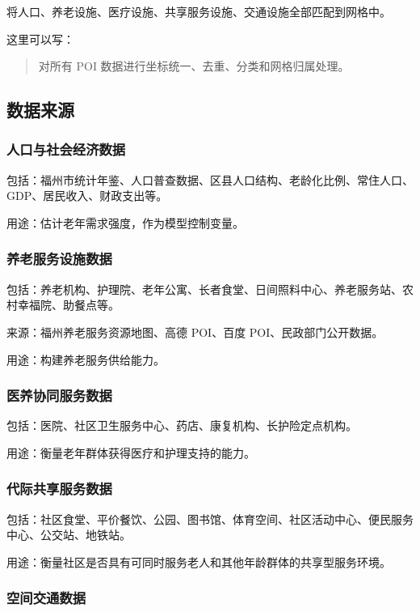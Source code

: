 \documentclass[UTF8,zihao=-4,a4paper,fontset=none]{ctexart}
\begin{document}
将人口、养老设施、医疗设施、共享服务设施、交通设施全部匹配到网格中。

这里可以写：

\begin{quote}
对所有 POI 数据进行坐标统一、去重、分类和网格归属处理。
\end{quote}

\subsection{数据来源}

\subsubsection{人口与社会经济数据}

包括：福州市统计年鉴、人口普查数据、区县人口结构、老龄化比例、常住人口、GDP、居民收入、财政支出等。

用途：估计老年需求强度，作为模型控制变量。

\subsubsection{养老服务设施数据}

包括：养老机构、护理院、老年公寓、长者食堂、日间照料中心、养老服务站、农村幸福院、助餐点等。

来源：福州养老服务资源地图、高德 POI、百度 POI、民政部门公开数据。

用途：构建养老服务供给能力。

\subsubsection{医养协同服务数据}

包括：医院、社区卫生服务中心、药店、康复机构、长护险定点机构。

用途：衡量老年群体获得医疗和护理支持的能力。

\subsubsection{代际共享服务数据}

包括：社区食堂、平价餐饮、公园、图书馆、体育空间、社区活动中心、便民服务中心、公交站、地铁站。

用途：衡量社区是否具有可同时服务老人和其他年龄群体的共享型服务环境。

\subsubsection{空间交通数据}
\end{document}
